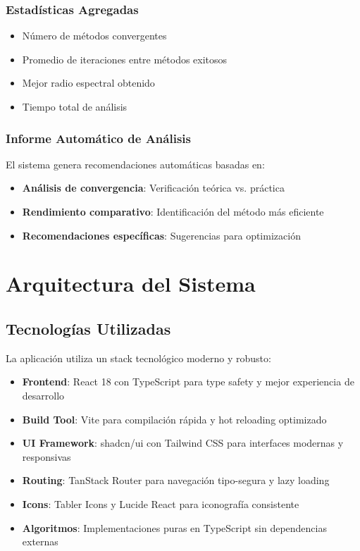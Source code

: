 \subsubsection{Estadísticas Agregadas}
\begin{itemize}
    \item Número de métodos convergentes
    \item Promedio de iteraciones entre métodos exitosos
    \item Mejor radio espectral obtenido
    \item Tiempo total de análisis
\end{itemize}

\subsubsection{Informe Automático de Análisis}
El sistema genera recomendaciones automáticas basadas en:
\begin{itemize}
    \item \textbf{Análisis de convergencia}: Verificación teórica vs. práctica
    \item \textbf{Rendimiento comparativo}: Identificación del método más eficiente
    \item \textbf{Recomendaciones específicas}: Sugerencias para optimización
\end{itemize}

\section{Arquitectura del Sistema}

\subsection{Tecnologías Utilizadas}

La aplicación utiliza un stack tecnológico moderno y robusto:

\begin{itemize}
    \item \textbf{Frontend}: React 18 con TypeScript para type safety y mejor experiencia de desarrollo
    \item \textbf{Build Tool}: Vite para compilación rápida y hot reloading optimizado
    \item \textbf{UI Framework}: shadcn/ui con Tailwind CSS para interfaces modernas y responsivas
    \item \textbf{Routing}: TanStack Router para navegación tipo-segura y lazy loading
    \item \textbf{Icons}: Tabler Icons y Lucide React para iconografía consistente
    \item \textbf{Algoritmos}: Implementaciones puras en TypeScript sin dependencias externas
\end{itemize}

